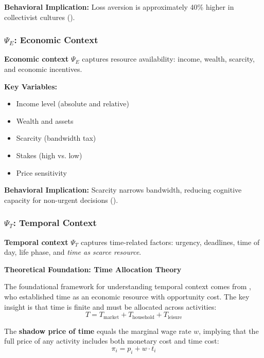 \textbf{Behavioral Implication:}
Loss aversion is approximately 40\% higher in collectivist cultures
(\citet{wang2017cultural}).

\subsubsection{$\Psi_E$: Economic Context}

\begin{definition}
\textbf{Economic context} $\Psi_E$ captures resource availability:
income, wealth, scarcity, and economic incentives.
\end{definition}

\textbf{Key Variables:}
\begin{itemize}[nosep]
\item Income level (absolute and relative)
\item Wealth and assets
\item Scarcity (bandwidth tax)
\item Stakes (high vs. low)
\item Price sensitivity
\end{itemize}

\textbf{Behavioral Implication:}
Scarcity narrows bandwidth, reducing cognitive capacity for non-urgent decisions
(\citet{mullainathan2013scarcity}).

\subsubsection{$\Psi_T$: Temporal Context}

\begin{definition}
\textbf{Temporal context} $\Psi_T$ captures time-related factors:
urgency, deadlines, time of day, life phase, and \textit{time as scarce resource}.
\end{definition}

\textbf{Theoretical Foundation: Time Allocation Theory}

The foundational framework for understanding temporal context comes from
\citet{PAP-becker1965theory}, who established time as an economic resource with
opportunity cost. The key insight is that time is finite and must be allocated
across activities:
\begin{equation}
T = T_{\text{market}} + T_{\text{household}} + T_{\text{leisure}}
\end{equation}

The \textbf{shadow price of time} equals the marginal wage rate $w$, implying
that the full price of any activity includes both monetary cost and time cost:
\begin{equation}
\pi_i = p_i + w \cdot t_i
\end{equation}

